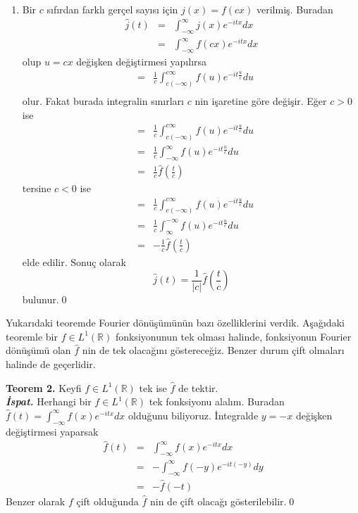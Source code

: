 \documentclass[a4paper, 10pt]{article}
\begin{document}
\begin{enumerate}
	\item Bir $c$ sıfırdan farklı gerçel sayısı için $j(x)=f(cx)$ verilmiş. Buradan
		\begin{eqnarray*}
		\widehat{j}(t)  &=&  \int_{-\infty }^{\infty } j(x) e^{-itx}dx  \\ 
		&=&  \int_{-\infty }^{\infty } f(cx) e^{-itx}dx
		\end{eqnarray*}
		olup $u=cx$ değişken değiştirmesi yapılırsa
		\begin{eqnarray*}
		&=& \frac{1}{c} \int_{c (-\infty) }^{c \infty } f(u)e^{-it\frac{u}{c}} du \\   
		\end{eqnarray*}
		olur. Fakat burada integralin sınırları $c$ nin işaretine göre değişir. Eğer $c>0$ ise
		\begin{eqnarray*}
		&=& \frac{1}{c} \int_{c (-\infty) }^{c \infty } f(u)e^{-it\frac{u}{c}} du \\   
		&=& \frac{1}{c} \int_{-\infty }^{\infty } f(u)e^{-it\frac{u}{c}} du \\  
		&=& \frac{1}{c} \widehat{f}(\frac{t}{c}) 
		\end{eqnarray*}
		tersine $c<0$ ise
		\begin{eqnarray*}
		&=& \frac{1}{c} \int_{c (-\infty) }^{c \infty } f(u)e^{-it\frac{u}{c}} du \\   
		&=& \frac{1}{c} \int_{\infty }^{-\infty } f(u)e^{-it\frac{u}{c}} du \\  
		&=& -\frac{1}{c} \widehat{f}(\frac{t}{c}) 
		\end{eqnarray*}
		elde edilir. Sonuç olarak
		$$ \widehat{j}(t) = \frac{1}{\left | c \right |} \widehat{f}(\frac{t}{c}) $$
		bulunur.\qed
\end{enumerate}

Yukarıdaki teoremde Fourier dönüşümünün bazı özelliklerini verdik. Aşağıdaki teoremle bir $f\in L^1(\mathbb{R})$ fonksiyonunun tek olması halinde, fonksiyonun Fourier dönüşümü olan $\widehat{f}$ nin de tek olacağını göstereceğiz. Benzer durum çift olmaları halinde de geçerlidir.

\textbf{Teorem 2.} Keyfi $f \in L^1(\mathbb{R})$ tek ise  $\widehat{f}$ de tektir.\\
\textit{\textbf{İspat.}} 
Herhangi bir $f \in L^1(\mathbb{R})$ tek fonksiyonu alalım. Buradan	$\widehat{f}(t) =  \int_{-\infty }^{\infty } f(x) e^{-itx}dx$ olduğunu biliyoruz. İntegralde $y=-x$ değişken değiştirmesi yaparsak  
	\begin{eqnarray*} 
		\widehat{f}(t) &=&  \int_{-\infty }^{\infty } f(x) e^{-itx}dx\\
		&=& - \int_{-\infty }^{ \infty } f(-y)e^{-it(-y)} dy \\   
		&=& -\widehat{f}(-t) 
	\end{eqnarray*}
Benzer olarak $f$ çift olduğunda $\widehat{f}$ nin de çift olacağı gösterilebilir.\qed
\end{document}
